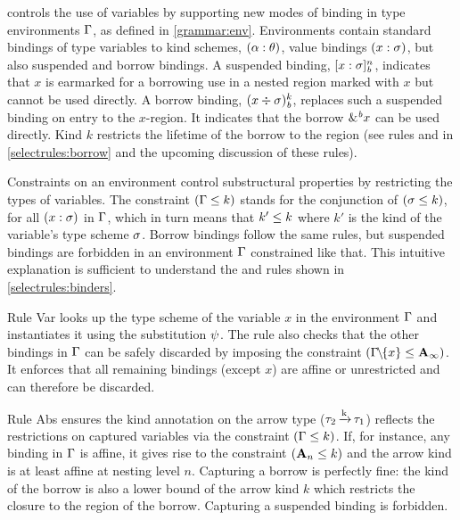 \lang controls the use of variables by supporting new modes of
binding in type environments $\Gamma$, as defined in \cref{grammar:env}.
Environments contain standard bindings of type variables to kind schemes,
$(\alpha : \theta)$, value bindings $(x : \sigma)$, but also
suspended and borrow bindings.
A suspended binding, $[x : \sigma]_{\textit{b}}^n$, indicates that $x$ is
earmarked for a borrowing use in a nested region
marked with $x$ %
but
cannot be used directly.
A borrow binding,
$( x \div \sigma)_{\textit{b}}^{k}$,
replaces
such a suspended binding on entry to the $x$-region. It indicates
that the borrow ${\&}^{\textit{b}}x$ can be used directly. Kind $k$
restricts the lifetime of the borrow to the region (see rules
 and  in
\cref{selectrules:borrow} and the upcoming discussion of these rules).


Constraints on an environment control substructural properties by
restricting the types of variables.  The constraint $(\Gamma \leq k)$
stands for the conjunction of $(\sigma \leq k)$, for all $(x : \sigma)$
in $\Gamma$, which in turn means that $k' \leq k$ where $k'$ is the kind of
the variable's type scheme $\sigma$.
Borrow bindings follow the same rules, but suspended bindings
are forbidden in an environment $\Gamma$ constrained like that.
This intuitive explanation is sufficient to understand
the  and  rules shown in
\cref{selectrules:binders}.

Rule {\sc Var} looks up the type scheme of the variable $x$ in
the environment $\Gamma$
and instantiates it using the substitution $\mathrm{\psi}$. The rule also
checks that the other bindings in $\Gamma$ can be safely discarded by
imposing the constraint $(\Gamma\!\!\mathbin{\setminus}\!\!\{x\} \leq \mathbf{A}_\infty)$.
It enforces that all remaining bindings (except $x$) are affine or
unrestricted and can therefore be discarded.

Rule {\sc Abs} ensures the kind annotation on the arrow type
($\tau_2 \operatorname{\xrightarrow{k}} \tau_1$) reflects the restrictions on captured variables
via the constraint $(\Gamma \leq k)$.
If, for instance, any binding in $\Gamma$ is affine, it gives rise to the
constraint $(\mathbf{A}_n \leq k)$ and the arrow kind is at least
affine at nesting level $n$.
Capturing a borrow is perfectly fine: the kind of the borrow is also a
lower bound of the arrow kind $k$ which restricts the closure
to the region of the borrow.
Capturing a suspended binding is forbidden.




